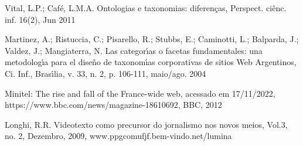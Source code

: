 \documentclass[
12pt,		%
openright,	%
twoside,  %
a4paper,			%
chapter=TITLE,		%
english,			%
french,				%
spanish,			%
brazil				%
]{USPSC-classe/USPSC}
\begin{document}
\begin{flushleft}
\begin{flushleft}
\begin{flushleft}
\begin{flushleft}
 Vital, L.P.; Caf\'e, L.M.A. Ontologias e taxonomias: diferen\c{c}as, Perspect. ci\^enc. inf. 16(2), Jun 2011
\end{flushleft}


\end{flushleft}


\end{flushleft}


\end{flushleft}


\begin{flushleft}
\begin{flushleft}
\begin{flushleft}
\begin{flushleft}
[MARTINEZ et al., 2004] Martinez, A.; Ristuccia, C.; Pisarello, R.; Stubbs, E.; Caminotti, L.; Balparda, J.; Valdez, J.; Mangiaterra, N. Las categor\'{\i}as o facetas fundamentales: una metodolog\'{\i}a para el diseño de taxonom\'{\i}as corporativas de sitios Web Argentinos, Ci. Inf., Bras\'{\i}lia, v. 33, n. 2, p. 106-111, maio/ago. 2004
\end{flushleft}


\end{flushleft}


\end{flushleft}


\end{flushleft}


\begin{flushleft}
\begin{flushleft}
\begin{flushleft}
\begin{flushleft}
[BBC, 2012] Minitel: The rise and fall of the France-wide web, acessado em 17/11/2022, https://www.bbc.com/news/magazine-18610692, BBC, 2012
\end{flushleft}


\end{flushleft}


\end{flushleft}


\end{flushleft}


\begin{flushleft}
\begin{flushleft}
\begin{flushleft}
\begin{flushleft}
[Longhi, 2009] Longhi, R.R. Videotexto como precursor do jornalismo nos novos meios, Vol.3, no. 2, Dezembro, 2009, www.ppgcomufjf.bem-vindo.net/lumina
\end{flushleft}


\end{flushleft}


\end{flushleft}


\end{flushleft}
\end{document}
